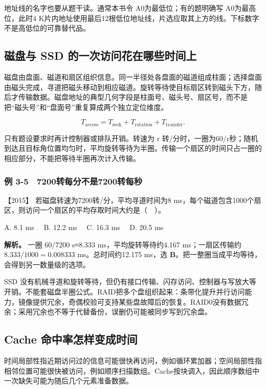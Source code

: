 地址线的名字也要从题干读。通常本书令 A0为最低位；有的题明确写 A0为最高位，此时4 K片内地址使用最后12根低位地址线，片选应取其上方的线。下标数字不是高低位的可靠替代品。

\subsection{磁盘与 SSD 的一次访问花在哪些时间上}\label{co-03-06}

磁盘由盘面、磁道和扇区组织信息。同一半径处各盘面的磁道组成柱面；选择盘面由磁头完成，寻道把磁头移动到相应磁道。旋转等待使目标扇区转到磁头下方，随后才传输数据。磁盘地址的典型几何字段是柱面号、磁头号、扇区号，而不是把``磁头号''和``盘面号''重复算成两个独立定位维度。

\[
T_{\mathrm{access}}=T_{\mathrm{seek}}+T_{\mathrm{rotation}}+T_{\mathrm{transfer}}.
\]

只有题设要求时再计控制器或排队开销。转速为 r 转/分时，一圈为60/r秒；随机到达且目标角位置均匀时，平均旋转等待为半圈。传输一个扇区的时间只占一圈的相应部分，不能把等待半圈再次计入传输。

\subsubsection{例 3-5　7200转每分不是7200转每秒}\label{co-ex3-5}

\noindent{}【2015】 若磁盘转速为7200转/分，平均寻道时间为8 ms，每个磁道包含1000个扇区，则访问一个扇区的平均存取时间大约是（　）。

A. 8.1 ms　 B. 12.2 ms　 C. 16.3 ms　 D. 20.5 ms


\textbf{解析。} 一圈 \(60/7200\) s≈8.333 ms，平均旋转等待约4.167 ms；一扇区传输约 \(8.333/1000=0.008333\) ms。总时间约12.175 ms，选 \textbf{B}。把一整圈当成平均等待，会得到另一数量级的选项。

SSD 没有机械寻道和旋转等待，但仍有接口传输、闪存访问、控制器与写放大等开销。不能套磁盘半圈公式。RAID把多个盘组织起来：条带化提升并行访问能力，镜像提供冗余，奇偶校验可支持某些盘故障后的恢复。RAID0没有数据冗余；采用冗余也不等于代替备份，误删仍可能被同步写到冗余盘。

\subsection{Cache 命中率怎样变成时间}\label{co-03-07}

时间局部性指近期访问过的信息可能很快再访问，例如循环累加器；空间局部性指相邻位置可能很快被访问，例如顺序扫描数组。Cache按块调入，因此顺序数组中一次缺失可能为随后几个元素准备数据。

